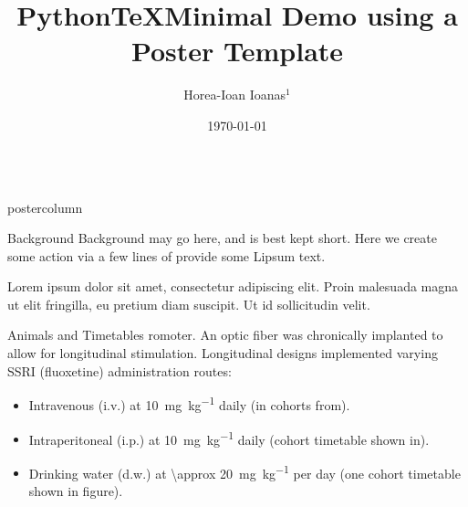 \documentclass{beamer}
\title{Python\TeX Minimal Demo using a Poster Template}
\author{Horea-Ioan Ioanas$^{1}$}
\institute[ETH]{$^{1}$Institute for Biomedical Engineering, ETH and University of Zurich}
\date{\today}
\newlength{\columnheight}
\begin{document}
\begin{frame}
\begin{columns}
	\begin{column}{.43\textwidth}
		\begin{beamercolorbox}[center]{postercolumn}
			\begin{minipage}{.98\textwidth}  %
				\parbox[t][\columnheight]{\textwidth}{ %
					\begin{myblock}{Background}
						Background may go here, and is best kept short.
						Here we create some action via a few lines of provide some Lipsum text.

						\vspace{0.8em}

						Lorem ipsum dolor sit amet, consectetur adipiscing elit.
						Proin malesuada magna ut elit fringilla, eu pretium diam suscipit. Ut id sollicitudin velit.
					\end{myblock}\vfill
					\vspace{-0.3em}
					\begin{myblock}{Animals and Timetables}
						romoter.
						An optic fiber was chronically implanted to allow for longitudinal stimulation.
						\vspace{0.4em}
						Longitudinal designs implemented varying SSRI (fluoxetine) administration routes:
						\begin{itemize}
							\item Intravenous (i.v.) at \SI{10}{\mg\per\kg} daily (in cohorts from).
							\item Intraperitoneal (i.p.) at \SI{10}{\mg\per\kg} daily (cohort timetable shown in).
							\item Drinking water (d.w.) at \SI{\approx 20}{\milli\gram\per\kilo\gram} per day (one cohort timetable shown in figure).
						\end{itemize}


\end{myblock}}
\end{minipage}
\end{beamercolorbox}
\end{column}
\end{columns}
\end{frame}
\end{document}
